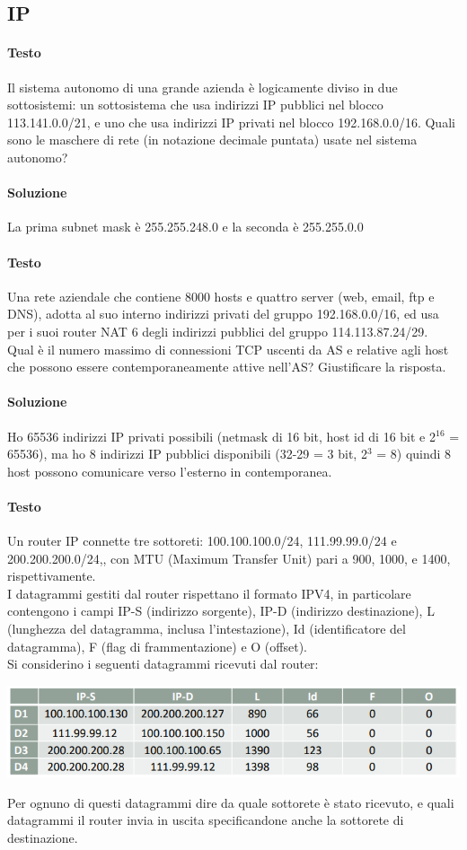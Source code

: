 \documentclass[10pt]{article}
\begin{document}
{\subsection{IP}
\paragraph{Testo} Il sistema autonomo di una grande azienda è logicamente diviso in due sottosistemi: un sottosistema che usa indirizzi IP pubblici nel blocco 113.141.0.0/21, e uno che usa indirizzi IP privati nel blocco 192.168.0.0/16. Quali sono le maschere di rete (in notazione decimale puntata) usate nel sistema autonomo?
\paragraph{Soluzione} La prima subnet mask è 255.255.248.0 e la seconda è 255.255.0.0
\paragraph{Testo} Una rete aziendale che contiene 8000 hosts e quattro server (web, email, ftp e DNS), adotta al suo interno indirizzi privati del gruppo 192.168.0.0/16, ed usa per i suoi router NAT 6 degli indirizzi pubblici del gruppo 114.113.87.24/29.\\
Qual è il numero massimo di connessioni TCP uscenti da AS e relative agli host che possono essere contemporaneamente attive nell’AS? Giustificare la risposta.
\paragraph{Soluzione} Ho 65536 indirizzi IP privati possibili (netmask di 16 bit, host id di 16 bit e 2$^{16}$ = 65536), ma ho 8 indirizzi IP pubblici disponibili (32-29 = 3 bit, 2$^3$ = 8) quindi 8 host possono comunicare verso l'esterno in contemporanea.
\pagebreak
\paragraph{Testo} Un router IP connette tre sottoreti: 100.100.100.0/24, 111.99.99.0/24 e 200.200.200.0/24,, con MTU (Maximum Transfer Unit) pari a 900, 1000, e 1400, rispettivamente.\\
I datagrammi gestiti dal router rispettano il formato IPV4, in particolare contengono i campi IP-S (indirizzo sorgente), IP-D (indirizzo destinazione), L (lunghezza del datagramma, inclusa l’intestazione), Id (identificatore del datagramma), F (flag di frammentazione) e O (offset).\\
Si considerino i seguenti datagrammi ricevuti dal router:
\begin{center}
\includegraphics[scale=0.7]{ipes2_tabella.png}
\end{center}
Per ognuno di questi datagrammi dire da quale sottorete è stato ricevuto, e quali datagrammi il router invia in uscita specificandone anche la sottorete di destinazione.
}
\end{document}
